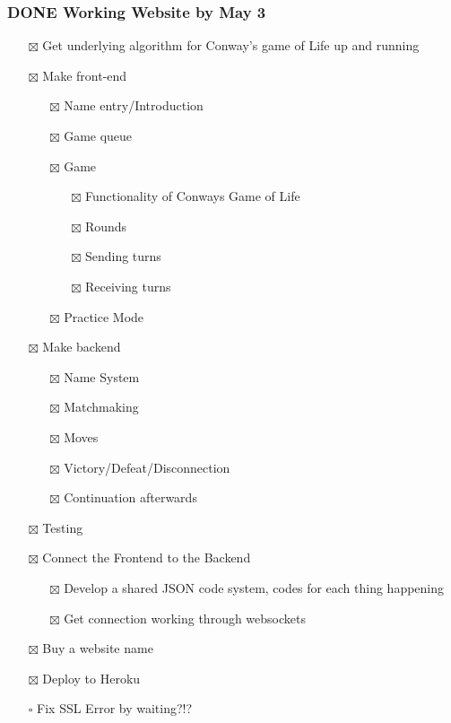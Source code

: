 \documentclass[11pt]{article}
\begin{document}
\subsubsection{{\bfseries\sffamily DONE} Working Website by May 3}
\label{sec:org26f7888}
\begin{itemize}
\item[{$\boxtimes$}] Get underlying algorithm for Conway's game of Life up and running
\item[{$\boxtimes$}] Make front-end
\begin{itemize}
\item[{$\boxtimes$}] Name entry/Introduction
\item[{$\boxtimes$}] Game queue
\item[{$\boxtimes$}] Game
\begin{itemize}
\item[{$\boxtimes$}] Functionality of Conways Game of Life
\item[{$\boxtimes$}] Rounds
\item[{$\boxtimes$}] Sending turns
\item[{$\boxtimes$}] Receiving turns
\end{itemize}
\item[{$\boxtimes$}] Practice Mode
\end{itemize}
\item[{$\boxtimes$}] Make backend
\begin{itemize}
\item[{$\boxtimes$}] Name System
\item[{$\boxtimes$}] Matchmaking
\item[{$\boxtimes$}] Moves
\item[{$\boxtimes$}] Victory/Defeat/Disconnection
\item[{$\boxtimes$}] Continuation afterwards
\end{itemize}
\item[{$\boxtimes$}] Testing
\item[{$\boxtimes$}] Connect the Frontend to the Backend
\begin{itemize}
\item[{$\boxtimes$}] Develop a shared JSON code system, codes for each thing happening
\item[{$\boxtimes$}] Get connection working through websockets
\end{itemize}
\item[{$\boxtimes$}] Buy a website name
\item[{$\boxtimes$}] Deploy to Heroku
\item[{$\square$}] Fix SSL Error by waiting?!?
\end{itemize}
\end{document}
